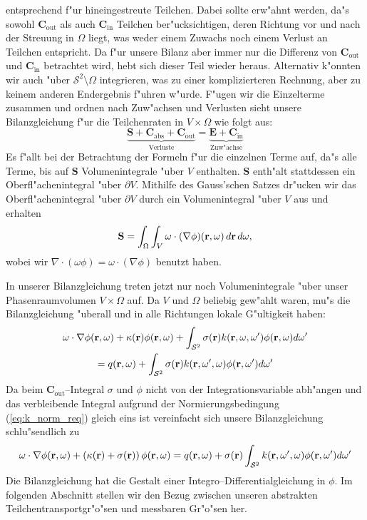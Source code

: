 \documentclass[11pt,a4paper,DIVcalc,BCOR8mm,titlepage,twoside]{scrartcl}
\begin{document}
	entsprechend f"ur hineingestreute Teilchen. Dabei sollte erw"ahnt werden, da"s sowohl $\mathbf{C}_\text{out}$ als auch $\mathbf{C}_\text{in}$ Teilchen ber"ucksichtigen, deren Richtung vor und nach der Streuung in $\Omega$ liegt, was weder einem Zuwachs noch einem Verlust an Teilchen entspricht. Da f"ur unsere Bilanz aber immer nur die Differenz von $\mathbf{C}_\text{out}$ und $\mathbf{C}_\text{in}$ betrachtet wird, hebt sich dieser Teil wieder heraus. Alternativ k"onnten wir auch "uber $\mathcal{S}^2 \setminus \Omega$ integrieren, was zu einer komplizierteren Rechnung, aber zu keinem anderen Endergebnis f"uhren w"urde. F"ugen wir die Einzelterme zusammen und ordnen nach Zuw"achsen und Verlusten sieht unsere Bilanzgleichung f"ur die Teilchenraten in $V \times \Omega$ wie folgt aus:
	$$\underbrace{\mathbf{S}+\mathbf{C}_\text{abs}+\mathbf{C}_\text{out}}_\text{Verluste}=\underbrace{\mathbf{E}+\mathbf{C}_\text{in}}_\text{Zuw"achse}$$
	Es f"allt bei der Betrachtung der Formeln f"ur die einzelnen Terme auf, da"s alle Terme, bis auf $\mathbf{S}$ Volumenintegrale "uber $V$ enthalten. $\mathbf{S}$ enth"alt stattdessen ein Oberfl"achenintegral "uber $\partial V$. Mithilfe des Gauss'schen Satzes dr"ucken wir das Oberfl"achenintegral "uber $\partial V$ durch ein Volumenintegral "uber $V$ aus und erhalten
	$$\mathbf{S}=\int_\Omega \int_V \omega \cdot (\nabla\phi)(\mathbf{r},\omega)\,d\mathbf{r}\,d\omega,$$
	wobei wir $\nabla \cdot(\omega\phi)=\omega\cdot(\nabla\phi)$ benutzt haben.
	
	In unserer Bilanzgleichung treten jetzt nur noch Volumenintegrale "uber unser Phasenraumvolumen $V \times \Omega$ auf. Da $V$ und $\Omega$ beliebig gew"ahlt waren, mu"s die Bilanzgleichung "uberall und in alle Richtungen lokale G"ultigkeit haben:
	\begin{multline*}
	  \omega\cdot\nabla\phi(\mathbf{r},\omega)+\kappa(\mathbf{r})\phi(\mathbf{r},\omega)+\int_{\mathcal{S}^2}\sigma(\mathbf{r})k(\mathbf{r},\omega,\omega')\phi(\mathbf{r},\omega)d\omega' \\
	  =q(\mathbf{r},\omega)+\int_{\mathcal{S}^2}\sigma(\mathbf{r})k(\mathbf{r},\omega',\omega)\phi(\mathbf{r},\omega')d\omega'
	\end{multline*}
	Da beim $\mathbf{C}_\text{out}$--Integral $\sigma$ und $\phi$ nicht von der Integrationsvariable abh"angen und das verbleibende Integral aufgrund der Normierungsbedingung (\ref{eq:k_norm_req}) gleich eins ist vereinfacht sich unsere Bilanzgleichung schlu"sendlich zu
	\begin{equation}\label{eq:particle_balance_equation}
	  \omega\cdot\nabla\phi(\mathbf{r},\omega)+\left(\kappa(\mathbf{r})+\sigma(\mathbf{r})\right)\phi(\mathbf{r},\omega)
	  =q(\mathbf{r},\omega)+\sigma(\mathbf{r})\int_{\mathcal{S}^2}k(\mathbf{r},\omega',\omega)\phi(\mathbf{r},\omega')d\omega'
	\end{equation}
	Die Bilanzgleichung hat die Gestalt einer Integro--Differentialgleichung in $\phi$.
	Im folgenden Abschnitt stellen wir den Bezug zwischen unseren abstrakten Teilchentransportgr"o"sen und messbaren Gr"o"sen her.
\end{document}
